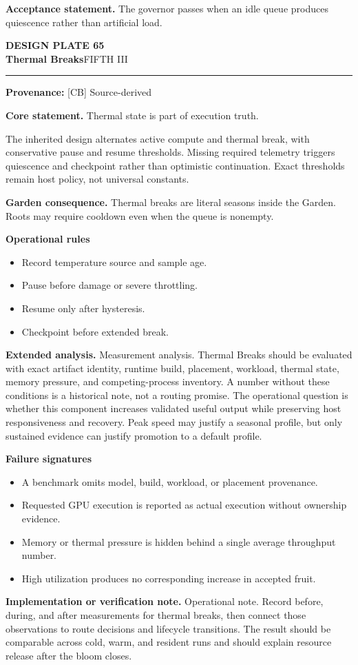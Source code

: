 \documentclass[10pt,letterpaper,oneside]{article}
\newcommand{\prov}[1]{\textcolor{gardenBlue}{\sffamily\footnotesize\textbf{Provenance:} #1}}
\newcommand{\platetitle}[3]{%
  \begin{minipage}[t][0.54in][t]{\textwidth}
  {\sffamily\bfseries\color{gardenDeep}\fontsize{9}{10}\selectfont DESIGN PLATE #1}\\[-1pt]
  {\sffamily\bfseries\color{gardenInk}\fontsize{16.5}{18}\selectfont #2}\hfill{\sffamily\color{gardenGreen}\large #3}
  \end{minipage}\vspace{-2pt}\hrule\vspace{5pt}}
\begin{document}
\begin{acceptbox}
\textbf{Acceptance statement.} The governor passes when an idle queue produces quiescence rather than artificial load.
\end{acceptbox}
\newpage
\platetitle{65}{Thermal Breaks}{FIFTH III}
\prov{[CB] Source-derived}
\fontsize{8.85}{10.45}\selectfont
\begin{corebox}
\textbf{Core statement.} Thermal state is part of execution truth.
\end{corebox}
The inherited design alternates active compute and thermal break, with conservative pause and resume thresholds. Missing required telemetry triggers quiescence and checkpoint rather than optimistic continuation. Exact thresholds remain host policy, not universal constants.

\textbf{Garden consequence.} Thermal breaks are literal seasons inside the Garden. Roots may require cooldown even when the queue is nonempty.

\textbf{Operational rules}
\begin{itemize}
\item Record temperature source and sample age.
\item Pause before damage or severe throttling.
\item Resume only after hysteresis.
\item Checkpoint before extended break.
\end{itemize}
\textbf{Extended analysis.} Measurement analysis. Thermal Breaks should be evaluated with exact artifact identity, runtime build, placement, workload, thermal state, memory pressure, and competing-process inventory. A number without these conditions is a historical note, not a routing promise. The operational question is whether this component increases validated useful output while preserving host responsiveness and recovery. Peak speed may justify a seasonal profile, but only sustained evidence can justify promotion to a default profile.

\textbf{Failure signatures}
\begin{itemize}
\item A benchmark omits model, build, workload, or placement provenance.
\item Requested GPU execution is reported as actual execution without ownership evidence.
\item Memory or thermal pressure is hidden behind a single average throughput number.
\item High utilization produces no corresponding increase in accepted fruit.
\end{itemize}
\textbf{Implementation or verification note.} Operational note. Record before, during, and after measurements for thermal breaks, then connect those observations to route decisions and lifecycle transitions. The result should be comparable across cold, warm, and resident runs and should explain resource release after the bloom closes.
\end{document}
